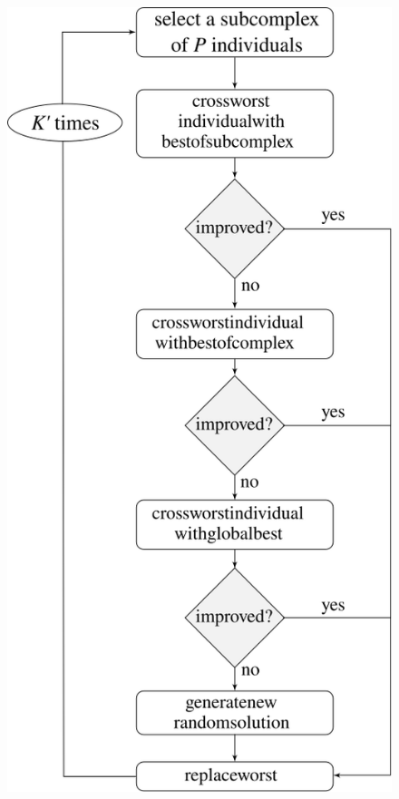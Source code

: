 \documentclass[a0,portrait]{a0poster}
\begin{document}
\begin{multicols}{2}
\begin{figure}
    \includegraphics[scale=1.5]{flow2}
  \label{fig:flow2}
\end{figure}


\end{multicols}
\end{document}

